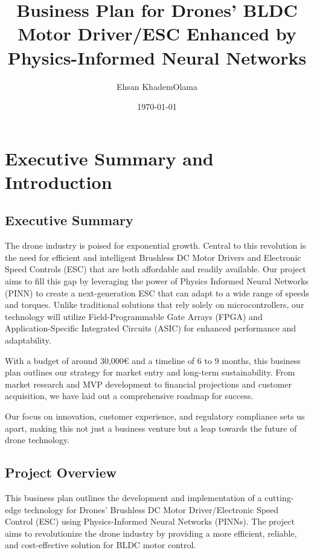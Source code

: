\documentclass[12pt]{article}
\title{Business Plan for Drones' BLDC Motor Driver/ESC Enhanced by Physics-Informed Neural Networks}
\author{Ehsan KhademOlama}
\date{\today}
\begin{document}
	
	\maketitle
	
	\tableofcontents
	\newpage
	
	\section{Executive Summary and Introduction}
	\subsection{Executive Summary}
	
	The drone industry is poised for exponential growth. Central to this revolution is the need for efficient and intelligent Brushless DC Motor Drivers and Electronic Speed Controls (ESC) that are both affordable and readily available. Our project aims to fill this gap by leveraging the power of Physics Informed Neural Networks (PINN) to create a next-generation ESC that can adapt to a wide range of speeds and torques. Unlike traditional solutions that rely solely on microcontrollers, our technology will utilize Field-Programmable Gate Arrays (FPGA) and Application-Specific Integrated Circuits (ASIC) for enhanced performance and adaptability.
	
	With a budget of around 30,000€ and a timeline of 6 to 9 months, this business plan outlines our strategy for market entry and long-term sustainability. From market research and MVP development to financial projections and customer acquisition, we have laid out a comprehensive roadmap for success.
	
	Our focus on innovation, customer experience, and regulatory compliance sets us apart, making this not just a business venture but a leap towards the future of drone technology.
	
	\subsection{Project Overview}
	This business plan outlines the development and implementation of a cutting-edge technology for Drones' Brushless DC Motor Driver/Electronic Speed Control (ESC) using Physics-Informed Neural Networks (PINNs). The project aims to revolutionize the drone industry by providing a more efficient, reliable, and cost-effective solution for BLDC motor control.
	
\end{document}
